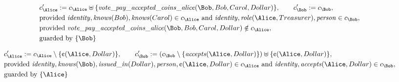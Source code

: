 \begin{align*}
&
c'_
{
\Alice
}
 := 
c_
{
\Alice
}
 \uplus 
\{
\mathit{\detokenize{
vote_pay_accepted_coins_alice
}}
(
\Bob
,
Bob
,
Carol
,
Dollar
)
\}
, \qquad 
c'_
{
\Bob
}
 := 
c_
{
\Bob
}
,\\
&
\text{provided } 
\mathit{\detokenize{
identity
}}
,
\mathit{\detokenize{
knows
}}
(
Bob
)
,
\mathit{\detokenize{
knows
}}
(
Carol
)
 \in c_
{
\Alice
}
 \text{ and } 
\mathit{\detokenize{
identity
}}
,
\mathit{\detokenize{
role
}}
(
\Alice
,
Treasurer
)
,
\mathit{\detokenize{
person
}}
 \in c_
{
\Bob
}
,\\
&
\text{provided } 
\mathit{\detokenize{
vote_pay_accepted_coins_alice
}}
(
\Bob
,
Bob
,
Carol
,
Dollar
)
 \notin c_
{
\Alice
}
,\\
&
\text{guarded by } \{
\Bob
\}
\end{align*}

\begin{align*}
&
c'_
{
\Alice
}
 := 
c_
{
\Alice
}
 \setminus 
\{
\text{\textcent}
(
\Alice
,
Dollar
)
\}
, \qquad 
c'_
{
\Bob
}
 := 
(c_
{
\Bob
}
 \setminus 
\{
\mathit{\detokenize{
accepts
}}
(
\Alice
,
Dollar
)
\}
) \uplus 
\{
\text{\textcent}
(
\Alice
,
Dollar
)
\}
,\\
&
\text{provided } 
\mathit{\detokenize{
identity
}}
,
\mathit{\detokenize{
knows
}}
(
\Bob
)
,
\mathit{\detokenize{
issued_in
}}
(
Dollar
)
,
\mathit{\detokenize{
person
}}
,
\text{\textcent}
(
\Alice
,
Dollar
)
 \in c_
{
\Alice
}
 \text{ and } 
\mathit{\detokenize{
identity
}}
,
\mathit{\detokenize{
accepts
}}
(
\Alice
,
Dollar
)
 \in c_
{
\Bob
}
,\\
&
\text{guarded by } \{
\Alice
\}
\end{align*}

